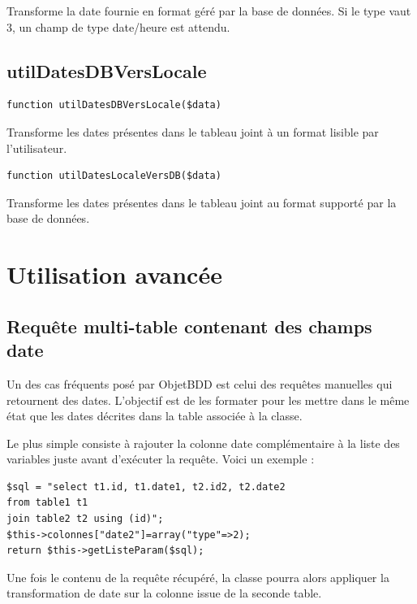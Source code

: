 Transforme la date fournie en format géré par la base de données. Si le type vaut 3, un champ de type date/heure est attendu.

\subsection{utilDatesDBVersLocale}
\begin{lstlisting}
function utilDatesDBVersLocale($data)
\end{lstlisting}

Transforme les dates présentes dans le tableau joint à un format lisible par l'utilisateur.

\begin{lstlisting}
function utilDatesLocaleVersDB($data)
\end{lstlisting}

Transforme les dates présentes dans le tableau joint au format supporté par la base de données.

\section{Utilisation avancée}
\subsection{Requête multi-table contenant des champs date}
Un des cas fréquents posé par ObjetBDD est celui des requêtes manuelles qui retournent des dates. L'objectif est de les formater pour les mettre dans le même état que les dates décrites dans la table associée à la classe.

Le plus simple consiste à rajouter la colonne date complémentaire à la liste des variables juste avant d'exécuter la requête. Voici un exemple :
\begin{lstlisting}
$sql = "select t1.id, t1.date1, t2.id2, t2.date2
from table1 t1
join table2 t2 using (id)";
$this->colonnes["date2"]=array("type"=>2);
return $this->getListeParam($sql);
\end{lstlisting}

Une fois le contenu de la requête récupéré, la classe pourra alors appliquer la transformation de date sur la colonne issue de la  seconde table.

